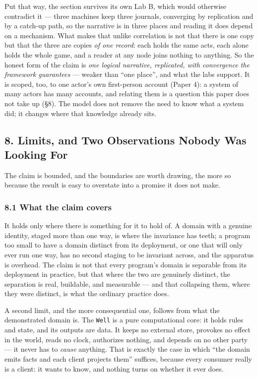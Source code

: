 \documentclass[
]{article}
\begin{document}
Put that way, the section survives its own Lab B, which would otherwise
contradict it --- three machines keep three journals, converging by
replication and by a catch-up path, so the narrative is in three places
and reading it does depend on a mechanism. What makes that unlike
correlation is not that there is one copy but that the three are copies
\emph{of one record}: each holds the same acts, each alone holds the
whole game, and a reader at any node joins nothing to anything. So the
honest form of the claim is \emph{one logical narrative, replicated,
with convergence the framework guarantees} --- weaker than ``one
place'', and what the labs support. It is scoped, too, to one actor's
own first-person account (Paper 4): a system of many actors has many
accounts, and relating them is a question this paper does not take up
(§8). The model does not remove the need to know what a system did; it
changes where that knowledge already sits.

\subsection{8. Limits, and Two Observations Nobody Was Looking
For}\label{limits-and-two-observations-nobody-was-looking-for}

The claim is bounded, and the boundaries are worth drawing, the more so
because the result is easy to overstate into a promise it does not make.

\subsubsection{8.1 What the claim covers}\label{what-the-claim-covers}

It holds only where there is something for it to hold of. A domain with
a genuine identity, staged more than one way, is where the invariance
has teeth; a program too small to have a domain distinct from its
deployment, or one that will only ever run one way, has no second
staging to be invariant across, and the apparatus is overhead. The claim
is not that every program's domain is separable from its deployment in
practice, but that where the two are genuinely distinct, the separation
is real, buildable, and measurable --- and that collapsing them, where
they were distinct, is what the ordinary practice does.

A second limit, and the more consequential one, follows from what the
demonstrated domain is. The \texttt{Well} is a pure computational core:
it holds rules and state, and its outputs are data. It keeps no external
store, provokes no effect in the world, reads no clock, authorizes
nothing, and depends on no other party --- it never has to \emph{cause}
anything. That is exactly the case in which ``the domain emits facts and
each client projects them'' suffices, because every consumer really is a
client: it wants to know, and nothing turns on whether it ever does.
\end{document}
